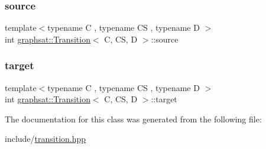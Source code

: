\mbox{\label{classgraphsat_1_1_transition_a968bd64e847732f78a159a18630f9c8e}} 
\subsubsection{\texorpdfstring{source}{source}}
{\footnotesize\ttfamily template$<$typename C , typename CS , typename D $>$ \\
int \mbox{\hyperlink{classgraphsat_1_1_transition}{graphsat\+::\+Transition}}$<$ C, CS, D $>$\+::source\hspace{0.3cm}{\ttfamily [private]}}

\mbox{\label{classgraphsat_1_1_transition_afbd4e7681da539737620c99ae44cb62e}} 
\subsubsection{\texorpdfstring{target}{target}}
{\footnotesize\ttfamily template$<$typename C , typename CS , typename D $>$ \\
int \mbox{\hyperlink{classgraphsat_1_1_transition}{graphsat\+::\+Transition}}$<$ C, CS, D $>$\+::target\hspace{0.3cm}{\ttfamily [private]}}



The documentation for this class was generated from the following file\+:\begin{DoxyCompactItemize}
\item 
include/\mbox{\hyperlink{transition_8hpp}{transition.\+hpp}}\end{DoxyCompactItemize}
